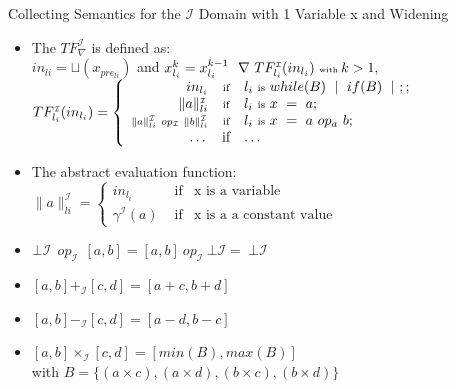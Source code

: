 \begin{frame}{Collecting Semantics for the $\mathcal{I}$ Domain with 1 Variable x and Widening}
\begin{itemize}
	\item  The $TF^{\scriptscriptstyle \mathcal{I}}_{\scriptscriptstyle \nabla}$ is defined as:\\$in_{li}=\sqcup(x_{pre_{li}})$ and $ x^k_{l_i}= x^{k-1}_{l_i}~~ \nabla~ TF^{\scriptscriptstyle \mathcal{I}}_{l_i}(in_{l_i}) ~\tiny \text{with} ~k>1,$\\ 
	$  TF^{\scriptscriptstyle \mathcal{I}}_{l_i}(in_{l_i}) =     \left\{ \begin{array}{rcl}
	\textstyle	in_{l_i} &  \mbox{\scriptsize if}& \textstyle l_i~\text{\scriptsize is}~while(B)~\mid~ if(B) ~\mid~;;   \\
	\textstyle	\|a\|_{li}^{\scriptscriptstyle \mathcal{I}}  & \mbox{\scriptsize if} & \textstyle l_i~\mbox{\scriptsize is}~x~=~a; \\
	\scriptstyle	\|a\|_{li}^{\scriptscriptstyle \mathcal{I}}~op_\mathcal{I}~ \|b\|_{li}^{\scriptscriptstyle \mathcal{I}}  & \mbox{\scriptsize if} &  \textstyle l_i~\mbox{\scriptsize is}~x~=~a~op_a~b; \\
	\dots & \mbox{if} & \dots
	\end{array}\right.$
	
	\item \scriptsize The abstract evaluation function:\\  $ \|a\|_{li}^ {\scriptscriptstyle \mathcal{I}} =     \left\{ \begin{array}{rcl}
	in_{l_i} & \mbox{ if}&  \text{x is a variable}   \\
	\gamma^{\scriptscriptstyle \mathcal{I}}(a)  & \mbox{ if} &  \text{x is a a constant value} 
	\end{array}\right.$
	
\end{itemize}
\begin{itemize}
	\item $\bot{\scriptscriptstyle \mathcal{I}} ~~op_{\scriptscriptstyle \mathcal{I}}~~ [a,b] = [a,b]~ op_{\scriptscriptstyle \mathcal{I}} ~\bot{\scriptscriptstyle \mathcal{I}} = ~\bot{\scriptscriptstyle \mathcal{I}}  $
	\item $[a,b] +_{\scriptscriptstyle \mathcal{I}}[c,d] = [a+c,b+d]$
	\item $[a,b] -_{\scriptscriptstyle \mathcal{I}}[c,d] = [a-d,b-c]$
	\item $ [a,b] \times_{\scriptscriptstyle \mathcal{I}}[c,d]=[min(B), max(B)] $\\ with $ B = \{(a \times c), (a \times d), (b\times c), (b \times d)\}$
\end{itemize}
\end{frame}


